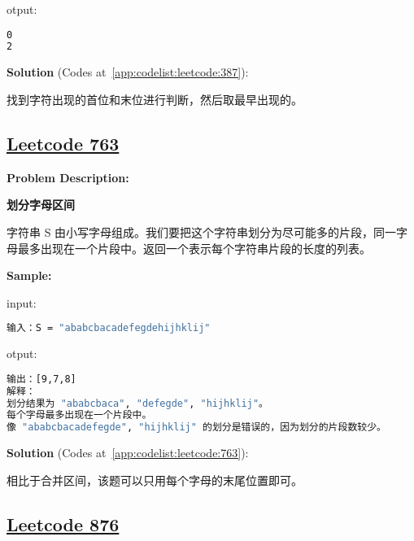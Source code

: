 otput:\par

\begin{lstlisting}[language=bash]
0
2
\end{lstlisting}

\textbf{Solution }(Codes at~\ref{app:codelist:leetcode:387}):\par

找到字符出现的首位和末位进行判断，然后取最早出现的。\par



\subsection{\href{https://leetcode-cn.com/}{Leetcode 763}}\label{app:problemlist:leetcode:763}

\textbf{Problem Description:}\par

\textbf{划分字母区间}\par

字符串 S 由小写字母组成。我们要把这个字符串划分为尽可能多的片段，同一字母最多出现在一个片段中。返回一个表示每个字符串片段的长度的列表。\par


\textbf{Sample:}\par

input:\par

\begin{lstlisting}[language=bash]
输入：S = "ababcbacadefegdehijhklij"
\end{lstlisting}

otput:\par

\begin{lstlisting}[language=bash]
输出：[9,7,8]
解释：
划分结果为 "ababcbaca", "defegde", "hijhklij"。
每个字母最多出现在一个片段中。
像 "ababcbacadefegde", "hijhklij" 的划分是错误的，因为划分的片段数较少。
\end{lstlisting}

\textbf{Solution }(Codes at~\ref{app:codelist:leetcode:763}):\par

相比于合并区间，该题可以只用每个字母的末尾位置即可。\par



\subsection{\href{https://leetcode-cn.com/}{Leetcode 876}}\label{app:problemlist:leetcode:876}


